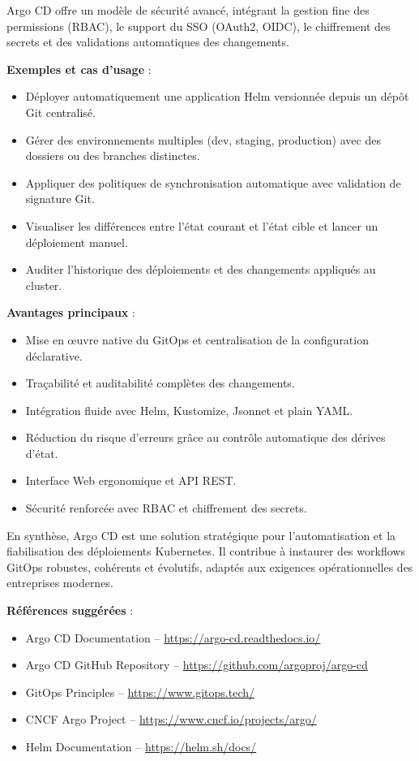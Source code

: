 Argo CD offre un modèle de sécurité avancé, intégrant la gestion fine des permissions (RBAC), le support du SSO (OAuth2, OIDC), le chiffrement des secrets et des validations automatiques des changements.

\textbf{Exemples et cas d’usage} :
\begin{itemize}
	\item Déployer automatiquement une application Helm versionnée depuis un dépôt Git centralisé.
	\item Gérer des environnements multiples (dev, staging, production) avec des dossiers ou des branches distinctes.
	\item Appliquer des politiques de synchronisation automatique avec validation de signature Git.
	\item Visualiser les différences entre l’état courant et l’état cible et lancer un déploiement manuel.
	\item Auditer l’historique des déploiements et des changements appliqués au cluster.
\end{itemize}

\textbf{Avantages principaux} :
\begin{itemize}
	\item Mise en œuvre native du GitOps et centralisation de la configuration déclarative.
	\item Traçabilité et auditabilité complètes des changements.
	\item Intégration fluide avec Helm, Kustomize, Jsonnet et plain YAML.
	\item Réduction du risque d’erreurs grâce au contrôle automatique des dérives d’état.
	\item Interface Web ergonomique et API REST.
	\item Sécurité renforcée avec RBAC et chiffrement des secrets.
\end{itemize}

En synthèse, Argo CD est une solution stratégique pour l’automatisation et la fiabilisation des déploiements Kubernetes. Il contribue à instaurer des workflows GitOps robustes, cohérents et évolutifs, adaptés aux exigences opérationnelles des entreprises modernes.

\textbf{Références suggérées} :
\begin{itemize}
	\item Argo CD Documentation – \url{https://argo-cd.readthedocs.io/}
	\item Argo CD GitHub Repository – \url{https://github.com/argoproj/argo-cd}
	\item GitOps Principles – \url{https://www.gitops.tech/}
	\item CNCF Argo Project – \url{https://www.cncf.io/projects/argo/}
	\item Helm Documentation – \url{https://helm.sh/docs/}
\end{itemize}

